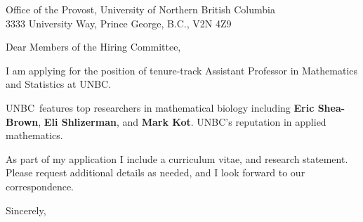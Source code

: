 \documentclass[11pt,a4paper]{letter}
\begin{document}

\def\School{UNBC}

\begin{letter}
{Office of the Provost, University of Northern British Columbia\\
3333 University Way, Prince George, B.C., V2N 4Z9
}


\opening{Dear Members of the Hiring Committee,}

I am applying for the position of tenure-track Assistant Professor in Mathematics and Statistics at \School. 



\School~features top researchers in mathematical biology including \textbf{Eric Shea-Brown}, \textbf{Eli Shlizerman}, and \textbf{Mark Kot}. \School's reputation in applied mathematics.



As part of my application I include a curriculum vitae, and research statement. Please request additional details as needed, and I look forward to our correspondence.

\closing{Sincerely,}
\end{letter}
\end{document}
